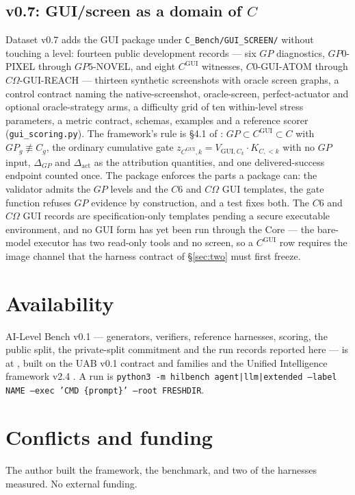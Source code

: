 \documentclass[11pt]{article}
\theoremstyle{definition}
\begin{document}
\subsection{v0.7: GUI/screen as a domain of \texorpdfstring{$C$}{C}}\label{sec:gui}

Dataset v0.7 adds the GUI package under \texttt{C\_Bench/GUI\_SCREEN/} without touching a level: fourteen public development records --- six $GP$ diagnostics, $GP0$-PIXEL through $GP5$-NOVEL, and eight $C^{\mathrm{GUI}}$ witnesses, $C0$-GUI-ATOM through $C\Omega$-GUI-REACH --- thirteen synthetic screenshots with oracle screen graphs, a control contract naming the native-screenshot, oracle-screen, perfect-actuator and optional oracle-strategy arms, a difficulty grid of ten within-level stress parameters, a metric contract, schemas, examples and a reference scorer (\texttt{gui\_scoring.py}). The framework's rule is \S4.1 of \citet{yang2026unified}: $GP \subset C^{\mathrm{GUI}} \subset C$ with $GP_g \not\equiv C_g$, the ordinary cumulative gate $z_{C^{\mathrm{GUI}},k} = V_{\mathrm{GUI},C_k}\cdot K_{C,<k}$ with no $GP$ input, $\Delta_{GP}$ and $\Delta_{\mathrm{act}}$ as the attribution quantities, and one delivered-success endpoint counted once. The package enforces the parts a package can: the validator admits the $GP$ levels and the $C6$ and $C\Omega$ GUI templates, the gate function refuses $GP$ evidence by construction, and a test fixes both. The $C6$ and $C\Omega$ GUI records are specification-only templates pending a secure executable environment, and no GUI form has yet been run through the Core --- the bare-model executor has two read-only tools and no screen, so a $C^{\mathrm{GUI}}$ row requires the image channel that the harness contract of \S\ref{sec:two} must first freeze.


\section*{Availability}

AI-Level Bench v0.1 --- generators, verifiers, reference harnesses, scoring, the public split, the private-split commitment and the run records reported here --- is at \citet{yang2026hilbench}, built on the UAB v0.1 contract and families \citep{yang2026uab} and the Unified Intelligence framework v2.4 \citep{yang2026unified}. A run is \texttt{python3 -m hilbench agent|llm|extended --label NAME --exec 'CMD \{prompt\}' --root FRESHDIR}.

\section*{Conflicts and funding}

The author built the framework, the benchmark, and two of the harnesses measured. No external funding.



\end{document}
